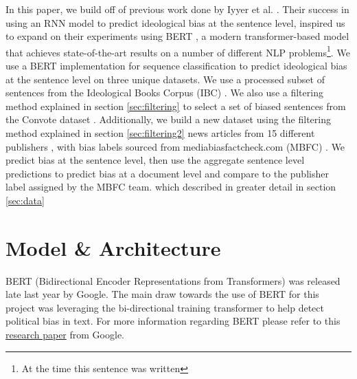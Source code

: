 \documentclass[10pt,a4paper,onecolumn]{article}
\begin{document}
In this paper, we build off of previous work done by Iyyer et al. \cite{iyyerRNN}. Their success in using an RNN model to predict ideological bias at the sentence level, inspired us to expand on their experiments using BERT \cite{bert}, a modern transformer-based model that achieves state-of-the-art results on a number of different NLP problems\footnote{At the time this sentence was written}. We use a BERT implementation for sequence classification to predict ideological bias at the sentence level on three unique datasets. We use a processed subset of sentences from the Ideological Books Corpus (IBC) \cite{gross2013ibc}. We also use a filtering method explained in section \ref{sec:filtering} to select a set of biased sentences from the Convote dataset \cite{convote}. Additionally, we build a new dataset using the filtering method explained in section \ref{sec:filtering2} news articles from 15 different publishers \cite{news}, with bias labels sourced from mediabiasfactcheck.com (MBFC) \cite{mbfc}. We predict bias at the sentence level, then use the aggregate sentence level predictions to predict bias at a document level and compare to the publisher label assigned by the MBFC team. which  described in greater detail in section \ref{sec:data}

\section{Model \& Architecture}
BERT (Bidirectional Encoder Representations from Transformers) was released late last year by Google. The main draw towards the use of BERT for this project was leveraging the bi-directional training transformer to help detect political bias in text. For more information regarding BERT please refer to this \href{https://arxiv.org/abs/1810.04805}{research paper} from Google.
\end{document}
